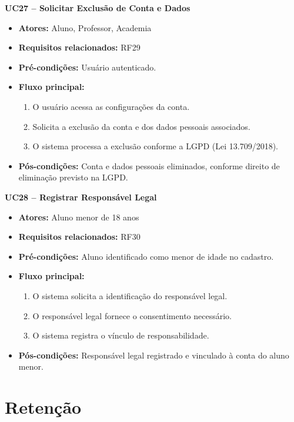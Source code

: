 \noindent\textbf{UC27 -- Solicitar Exclusão de Conta e Dados}
\begin{itemize}[leftmargin=*, itemsep=0pt, topsep=2pt]
  \item \textbf{Atores:} Aluno, Professor, Academia
  \item \textbf{Requisitos relacionados:} RF29
  \item \textbf{Pré-condições:} Usuário autenticado.
  \item \textbf{Fluxo principal:}
  \begin{enumerate}[label=\arabic*., itemsep=0pt, topsep=0pt]
    \item O usuário acessa as configurações da conta.
    \item Solicita a exclusão da conta e dos dados pessoais associados.
    \item O sistema processa a exclusão conforme a LGPD (Lei 13.709/2018).
  \end{enumerate}
  \item \textbf{Pós-condições:} Conta e dados pessoais eliminados, conforme direito de eliminação previsto na LGPD.
\end{itemize}
\medskip

\noindent\textbf{UC28 -- Registrar Responsável Legal}
\begin{itemize}[leftmargin=*, itemsep=0pt, topsep=2pt]
  \item \textbf{Atores:} Aluno menor de 18 anos
  \item \textbf{Requisitos relacionados:} RF30
  \item \textbf{Pré-condições:} Aluno identificado como menor de idade no cadastro.
  \item \textbf{Fluxo principal:}
  \begin{enumerate}[label=\arabic*., itemsep=0pt, topsep=0pt]
    \item O sistema solicita a identificação do responsável legal.
    \item O responsável legal fornece o consentimento necessário.
    \item O sistema registra o vínculo de responsabilidade.
  \end{enumerate}
  \item \textbf{Pós-condições:} Responsável legal registrado e vinculado à conta do aluno menor.
\end{itemize}
\medskip

\section*{Retenção}

